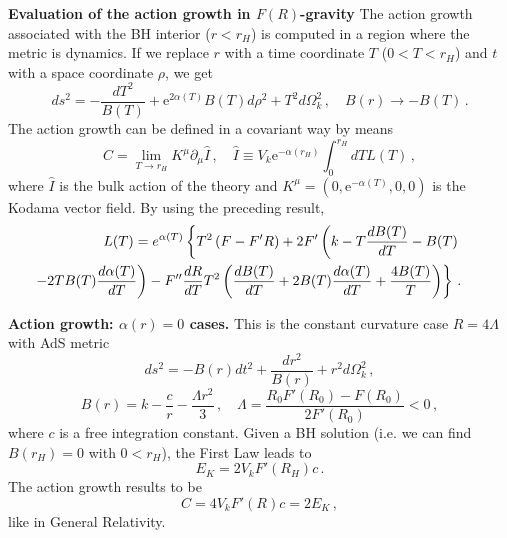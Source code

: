 \documentclass[ignorenonframetext,slidestop,compress]{beamer}
\begin{document}
\begin{frame}
{\bf Evaluation of the action growth in $F(R)$-gravity}
The action growth associated with the BH interior ($r<r_H$) is computed in a region where the metric is dynamics.  
If we replace $r$ with a time coordinate $T$ ($0<T<r_H$) and $t$ with a space coordinate $\rho$, we get
\begin{equation*}
 ds^2=-\frac{dT^2}{B(T)}+\text{e}^{2\alpha(T)}B(T)d\rho^2+ T^2d\Omega^2_k\,,\quad  B(r)\rightarrow -B(T)\,.
 \label{imetric}
\end{equation*}
 The action growth can be defined in a covariant way by means
\begin{equation*}
 C= \lim_{T \rightarrow r_H} K^\mu \partial_\mu \hat{I}\,,\quad \hat I\equiv V_k \text{e}^{-\alpha(r_H)}\int_0^{r_H} dT L(T)\,,
\end{equation*} 
where $\hat I$ is the bulk action of the theory and $K^\mu=(0,\text{e}^{-\alpha(T)},0,0)$ is the Kodama vector field. By using the preceding result,
 \begin{eqnarray*}
&& L(T) = e^{\alpha(T)}\left\{T^2\left(F-F'R\right)+2F'\left(k- T\frac{d B(T)}{dT}- B(T)
 \right.\right. \\ &&
\hspace{-1cm}              \left.\left.
 -2T B(T)\frac{d\alpha(T)}
 {d T}\right)
-F''\frac{d R}{d T}T^2\left(\frac{d B(T)}{d T}+2B(T)\frac{d \alpha(T)}{dT}+\frac{4B(T)}{T}\right)\right\}\,.
 \end{eqnarray*}
 \end{frame}

\begin{frame}
{\bf Action growth: $\alpha(r)=0$ cases.}
This is the constant curvature case $R=4\Lambda$ with AdS metric 
\begin{equation*}
ds^2=-B(r)dt^2+\frac{d r^2}{B(r)}+r^2d\Omega^2_k\,, 
\end{equation*}
 \begin{equation*}
B(r)=k-\frac{c}{r}-\frac{\Lambda r^2}{3}\,,\quad
\Lambda=\frac{R_0 F'(R_0)-F(R_0)}{2 F'(R_0)}<0\,,\label{SdS}
\end{equation*}
where $c$ is a free integration constant. Given a BH solution (i.e. we can find $B(r_H)=0$ with $0<r_H$), the First Law leads to
\begin{equation*}
E_K=2V_k F'(R_H)c\,.
\end{equation*}
The action growth results to be
\begin{equation*}
C=4 V_{k}F'(R)c=2E_K\,,
\end{equation*}
like in General Relativity. 
\end{frame}
 
\end{document}
